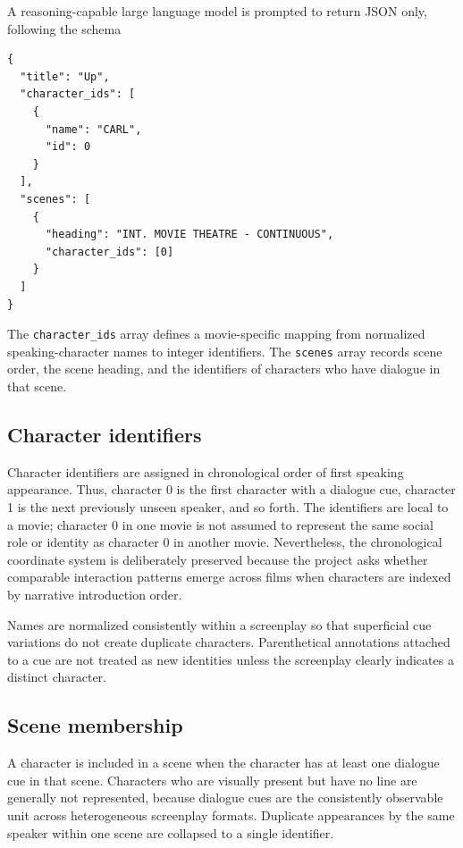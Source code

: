 \documentclass[11pt]{article}
\begin{document}
A reasoning-capable large language model is prompted to return JSON only, following the schema

\begin{verbatim}
{
  "title": "Up",
  "character_ids": [
    {
      "name": "CARL",
      "id": 0
    }
  ],
  "scenes": [
    {
      "heading": "INT. MOVIE THEATRE - CONTINUOUS",
      "character_ids": [0]
    }
  ]
}
\end{verbatim}

The \texttt{character\_ids} array defines a movie-specific mapping from normalized speaking-character names to integer identifiers. The \texttt{scenes} array records scene order, the scene heading, and the identifiers of characters who have dialogue in that scene.

\subsection{Character identifiers}

Character identifiers are assigned in chronological order of first speaking appearance. Thus, character 0 is the first character with a dialogue cue, character 1 is the next previously unseen speaker, and so forth. The identifiers are local to a movie; character 0 in one movie is not assumed to represent the same social role or identity as character 0 in another movie. Nevertheless, the chronological coordinate system is deliberately preserved because the project asks whether comparable interaction patterns emerge across films when characters are indexed by narrative introduction order.

Names are normalized consistently within a screenplay so that superficial cue variations do not create duplicate characters. Parenthetical annotations attached to a cue are not treated as new identities unless the screenplay clearly indicates a distinct character.

\subsection{Scene membership}

A character is included in a scene when the character has at least one dialogue cue in that scene. Characters who are visually present but have no line are generally not represented, because dialogue cues are the consistently observable unit across heterogeneous screenplay formats. Duplicate appearances by the same speaker within one scene are collapsed to a single identifier.
\end{document}
